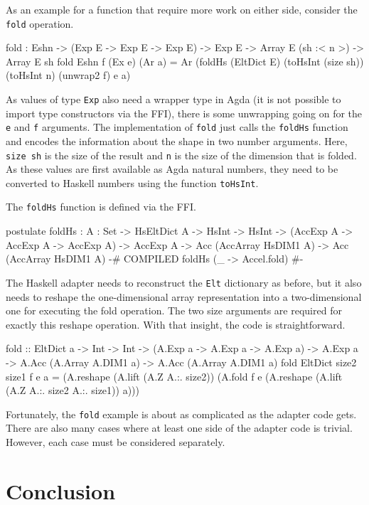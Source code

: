 \documentclass{llncs}
\begin{document}
As an example for a function that require more work on either side,
consider the \texttt{fold} operation. 
\begin{code}
fold : {E}{sh}{n}
     -> (Exp E -> Exp E -> Exp E)
     -> Exp E
     -> Array E (sh :< n >)
     -> Array E sh
fold {E}{sh}{n} f (Ex e) (Ar a) =
  Ar (foldHs (EltDict E) (toHsInt (size sh)) (toHsInt n)
             (unwrap2 f) e a)
\end{code}
As values of type \texttt{Exp} also need a wrapper type in Agda (it is
not possible to import type constructors via the FFI), there is some
unwrapping going on for the \texttt{e} and \texttt{f}
arguments. The implementation of \texttt{fold} just calls the
\texttt{foldHs} function and encodes the information about the shape
in two number arguments. Here, \texttt{size sh} is the size of the
result and \texttt{n} is the size of the dimension that is folded. As
these values are first available as Agda natural numbers, they need to
be converted to Haskell numbers using the function \texttt{toHsInt}.

The \texttt{foldHs} function is defined via the FFI.
\begin{code}
postulate
  foldHs : {A : Set}
          -> HsEltDict A
          -> HsInt
          -> HsInt
          -> (AccExp A -> AccExp A -> AccExp A)
          -> AccExp A
          -> Acc (AccArray HsDIM1 A)
          -> Acc (AccArray HsDIM1 A)
  {-# COMPILED foldHs      (\_ -> Accel.fold) #-}
\end{code}
The Haskell adapter needs to reconstruct the \texttt{Elt} dictionary
as before, but it also needs to reshape the one-dimensional array
representation into a two-dimensional one for executing the fold
operation. The two size arguments are required for exactly this
reshape operation. With that insight, the code is straightforward.
\begin{hcode}
fold :: EltDict a
     -> Int -> Int
     -> (A.Exp a -> A.Exp a -> A.Exp a)
     -> A.Exp a
     -> A.Acc (A.Array A.DIM1 a)
     -> A.Acc (A.Array A.DIM1 a)
fold EltDict size2 size1 f e a =
     (A.reshape (A.lift (A.Z A.:. size2))
      (A.fold f e
       (A.reshape (A.lift (A.Z A.:. size2 A.:. size1)) a)))
\end{hcode}

Fortunately, the \texttt{fold} example is about as complicated as the
adapter code gets. There are also many cases where at least one side
of the adapter code is trivial. However, each case must be considered
separately. 

\section{Conclusion}
\label{sec:conclusion}
\end{document}
